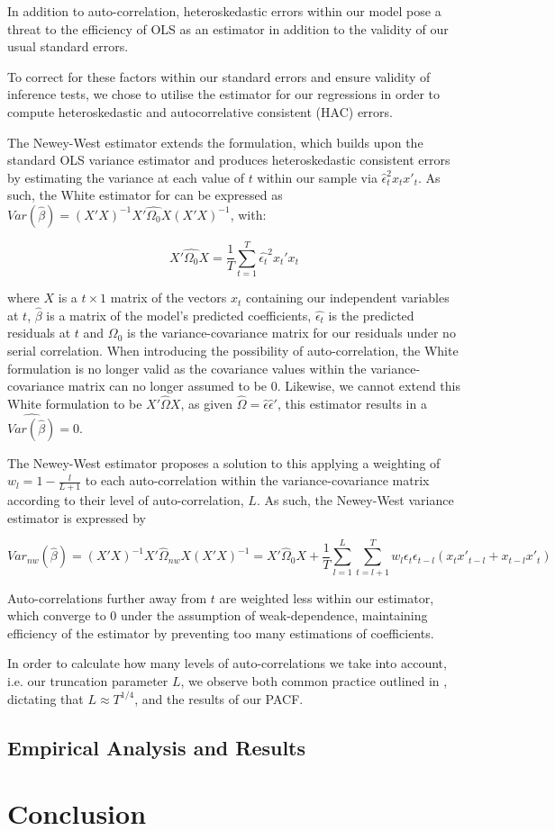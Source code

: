 \documentclass[12pt]{article}
\begin{document}
In addition to auto-correlation, heteroskedastic errors within our model pose a threat to the efficiency of OLS as an estimator in addition to the validity of our usual standard errors.

To correct for these factors within our standard errors and ensure validity of inference tests, we chose to utilise the \citet{newey} estimator for our regressions in order to compute heteroskedastic and autocorrelative consistent (HAC) errors.

The Newey-West estimator extends the \citet{white} formulation, which builds upon the standard OLS variance estimator and produces heteroskedastic consistent errors by estimating the variance at each value of $t$ within our sample via $\hat{\epsilon}^2_tx_tx'_t$. As such, the White estimator for can be expressed as $Var(\hat{\beta})=(X'X)^{-1}X'\hat{\Omega_0}X(X'X)^{-1}$, with:

$$
X'\hat{\Omega_0}X=\frac{1}{T}\sum_{t=1}^T\hat{\epsilon_t}^2x_t'x_t
$$

where $X$ is a $t\times1$ matrix of the vectors $x_t$ containing our independent variables at $t$, $\hat{\beta}$ is a matrix of the model’s predicted coefficients, $\hat{\epsilon_t}$ is the predicted residuals at $t$ and $\Omega_0$ is the variance-covariance matrix for our residuals under no serial correlation. When introducing the possibility of auto-correlation, the White formulation is no longer valid as the covariance values within the variance-covariance matrix can no longer assumed to be 0. Likewise, we cannot extend this White formulation to be $X'\hat{\Omega}X$, as given $\hat{\Omega}=\hat{\epsilon}\hat{\epsilon}'$, this estimator results in a $\hat{Var(\hat{\beta})}=0$.

The Newey-West estimator proposes a solution to this applying a weighting of $w_l=1-\frac{l}{L+1}$ to each auto-correlation within the variance-covariance matrix according to their level of auto-correlation, $L$. As such, the Newey-West variance estimator is expressed by

$$
Var_{nw}(\hat{\beta})=(X'X)^{-1}X'\hat{\Omega}_{nw}X(X'X)^{-1}=X'\hat{\Omega}_0X+\frac{1}{T}\sum^L_{l=1}\sum^T_{t=l+1}w_l\epsilon_t\epsilon_{t-l}(x_tx'_{t-l}+x_{t-l}x'_t)
$$

Auto-correlations further away from $t$ are weighted less within our estimator, which converge to 0 under the assumption of weak-dependence, maintaining efficiency of the estimator by preventing too many estimations of coefficients.

In order to calculate how many levels of auto-correlations we take into account, i.e. our truncation parameter $L$, we observe both common practice outlined in \cite{greene}, dictating that $L\approx{T^{1/4}}$, and the results of our PACF.

\subsection{Empirical Analysis and Results}



\break

\section{Conclusion}

\break



\end{document}
